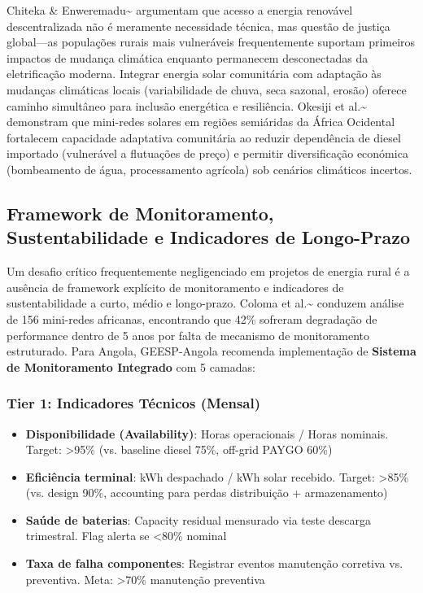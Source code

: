 \documentclass[12pt, a4paper]{article}
\begin{document}
Chiteka \& Enweremadu\textasciitilde{}\citep{Chiteka2025} argumentam que acesso a energia renovável descentralizada não é meramente necessidade técnica, mas questão de justiça global—as populações rurais mais vulneráveis frequentemente suportam primeiros impactos de mudança climática enquanto permanecem desconectadas da eletrificação moderna. Integrar energia solar comunitária com adaptação às mudanças climáticas locais (variabilidade de chuva, seca sazonal, erosão) oferece caminho simultâneo para inclusão energética e resiliência. Okesiji et al.\textasciitilde{}\citep{Okesiji2025} demonstram que mini-redes solares em regiões semiáridas da África Ocidental fortalecem capacidade adaptativa comunitária ao reduzir dependência de diesel importado (vulnerável a flutuações de preço) e permitir diversificação económica (bombeamento de água, processamento agrícola) sob cenários climáticos incertos.

\subsection{Framework de Monitoramento, Sustentabilidade e Indicadores de Longo-Prazo}

Um desafio crítico frequentemente negligenciado em projetos de energia rural é a ausência de framework explícito de monitoramento e indicadores de sustentabilidade a curto, médio e longo-prazo. Coloma et al.\textasciitilde{}\citep{Coloma2025} conduzem análise de 156 mini-redes africanas, encontrando que 42\% sofreram degradação de performance dentro de 5 anos por falta de mecanismo de monitoramento estruturado. Para Angola, GEESP-Angola recomenda implementação de \textbf{Sistema de Monitoramento Integrado} com 5 camadas:

\subsubsection{Tier 1: Indicadores Técnicos (Mensal)}
\begin{itemize}
\item \textbf{Disponibilidade (Availability)}: Horas operacionais / Horas nominais. Target: >95\% (vs. baseline diesel 75\%, off-grid PAYGO 60\%)
\item \textbf{Eficiência terminal}: kWh despachado / kWh solar recebido. Target: >85\% (vs. design 90\%, accounting para perdas distribuição + armazenamento)
\item \textbf{Saúde de baterias}: Capacity residual mensurado via teste descarga trimestral. Flag alerta se <80\% nominal
\item \textbf{Taxa de falha componentes}: Registrar eventos manutenção corretiva vs. preventiva. Meta: >70\% manutenção preventiva
\end{itemize}
\end{document}
